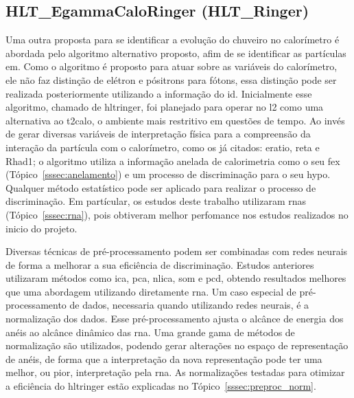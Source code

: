 \subsection{HLT\_EgammaCaloRinger (HLT\_Ringer)}
\label{ssec:hlt_ringer}


Uma outra proposta para se identificar a evolução do chuveiro no calorímetro é 
abordada pelo algoritmo alternativo proposto, afim de se identificar as
partículas \gls{em}. Como o algoritmo é proposto para atuar sobre as variáveis
do calorímetro, ele não faz distinção de elétron e pósitrons para fótons, essa
distinção pode ser realizada posteriormente utilizando a informação do \gls{id}.
Inicialmente esse algoritmo, chamado de \gls{hltringer}, foi planejado para operar no
\acrlong{l2} como uma alternativa ao \gls{t2calo}, o ambiente mais restritivo 
em questões de tempo. Ao invés de gerar diversas variáveis de interpretação física 
para a compreensão da interação da partícula com o calorímetro, como os já
citados: \gls{eratio}, \gls{reta} e \gls{Rhad1}; o algoritmo utiliza a informação anelada
de calorimetria como o seu \gls{fex} (Tópico~\ref{sssec:anelamento}) 
e um processo de discriminação para o seu \gls{hypo}. Qualquer método estatístico 
pode ser aplicado para realizar o processo de discriminação. 
Em partícular, os estudos deste trabalho utilizaram \glspl{rna} \cite{neural_networks} 
(Tópico~\ref{sssec:rna}), pois obtiveram melhor perfomance nos estudos
realizados no inicio do projeto.

Diversas técnicas de pré-processamento podem ser combinadas com redes neurais de
forma a melhorar a sua eficiência de discriminação. Estudos anteriores
\cite{tese_eduardo,tese_torres} utilizaram métodos como \gls{ica}, \gls{pca},
\gls{nlica}, \gls{som} e \gls{pcd}, obtendo resultados melhores que uma
abordagem utilizando diretamente \gls{rna}. Um caso especial de pré-processamento 
de dados, necessaria quando utilizando redes neurais, é a normalização dos dados. Esse 
pré-processamento ajusta o alcânce de energia dos anéis ao alcânce dinâmico das
\gls{rna}. Uma grande gama de métodos de normalização são utilizados, podendo
gerar alterações no espaço de representação de anéis, de forma que a
interpretação da nova representação pode ter uma melhor, ou pior, interpretação
pela \gls{rna}. As normalizações testadas para otimizar a eficiência do
\gls{hltringer} estão explicadas no Tópico~\ref{sssec:preproc_norm}.


